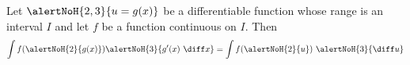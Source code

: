 \begin{frame}
\begin{theorem}
Let $\alertNoH{2,3}{u = g(x)}$ be a differentiable function whose range is an interval $I$ and let $f$ be a function continuous on $I$. Then
\[
\int f(\alertNoH{2}{ g(x)} ) \alertNoH{3}{g'(x) \ \diff x} = \int f(\alertNoH{2}{u} )\ \alertNoH{3}{\diff u}
\]
\end{theorem}
\end{frame}
